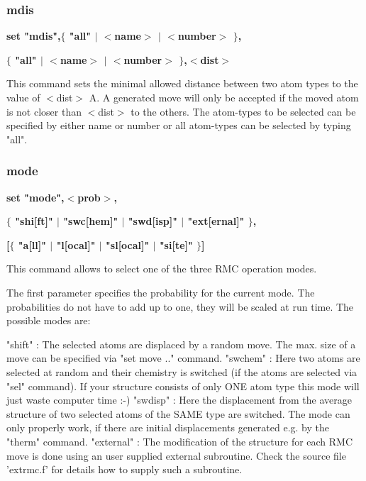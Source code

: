 \subsubsection{mdis}
{\bf set "mdis",$ \{$ "all" $| $ $ <$name$> $ $| $ $ <$number$> $ $\} $, \par }
{\bf            $ \{$ "all" $| $ $ <$name$> $ $| $ $ <$number$> $ $\} $,$ <$dist$> $ \par }
\par
\vspace{3pt}
This command sets the minimal allowed distance between two atom types 
to the value of $ <$dist$> $ A. A generated move will only be accepted 
if the moved atom is not closer than $ <$dist$> $ to the others. The 
atom-types to be selected can be specified by either name or number or 
all atom-types can be selected by typing "all". 
\subsubsection{mode}
{\bf set "mode",$ <$prob$> $, \par }
{\bf            $ \{$ "shi[ft]" $| $ "swc[hem]" $| $ "swd[isp]" $| $ "ext[ernal]" $\} $, \par }
{\bf           [$ \{$ "a[ll]"   $| $ "l[ocal]"  $| $ "sl[ocal]" $| $ "si[te]"     $\} $] \par }
\par
\vspace{3pt}
This command allows to select one of the three RMC operation modes. 
\par
The first parameter specifies the probability for the current mode. 
The probabilities do not have to add up to one, they will be scaled 
at run time. 
The possible modes are: 
\par
\begin{MacVerbatim}
"shift"    : The selected atoms are displaced by a random move. The
             max. size of a move can be specified via "set move .."
             command.
"swchem"   : Here two atoms are selected at random and their chemistry
             is switched (if the atoms are selected via "sel" command).
             If your structure consists of only ONE atom type this mode
             will just waste computer time :-)
"swdisp"   : Here the displacement from the average structure of two
             selected atoms of the SAME type are switched. The mode
             can only properly work, if there are initial displacements
             generated e.g. by the "therm" command.
"external" : The modification of the structure for each RMC move is done
             using an user supplied external subroutine. Check the
             source file 'extrmc.f' for details how to supply such a
             subroutine.
\end{MacVerbatim}
